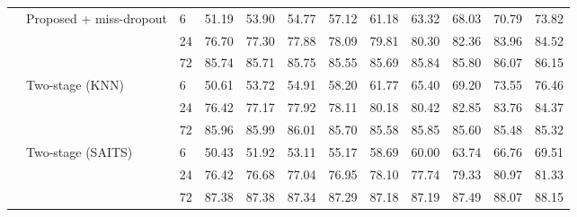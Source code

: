 \begin{table}
\begin{tabular}{lllrrrrrrrrr}
\cline{2-12}
 & \multirow[t]{3}{*}{Proposed + miss-dropout} & 6 & 51.19 & 53.90 & 54.77 & 57.12 & 61.18 & 63.32 & 68.03 & 70.79 & 73.82 \\
 &  & 24 & 76.70 & 77.30 & 77.88 & 78.09 & 79.81 & 80.30 & 82.36 & 83.96 & 84.52 \\
 &  & 72 & 85.74 & 85.71 & 85.75 & 85.55 & 85.69 & 85.84 & 85.80 & 86.07 & 86.15 \\
\cline{2-12}
 & \multirow[t]{3}{*}{Two-stage (KNN)} & 6 & 50.61 & 53.72 & 54.91 & 58.20 & 61.77 & 65.40 & 69.20 & 73.55 & 76.46 \\
 &  & 24 & 76.42 & 77.17 & 77.92 & 78.11 & 80.18 & 80.42 & 82.85 & 83.76 & 84.37 \\
 &  & 72 & 85.96 & 85.99 & 86.01 & 85.70 & 85.58 & 85.85 & 85.60 & 85.48 & 85.32 \\
\cline{2-12}
 & \multirow[t]{3}{*}{Two-stage (SAITS)} & 6 & 50.43 & 51.92 & 53.11 & 55.17 & 58.69 & 60.00 & 63.74 & 66.76 & 69.51 \\
 &  & 24 & 76.42 & 76.68 & 77.04 & 76.95 & 78.10 & 77.74 & 79.33 & 80.97 & 81.33 \\
 &  & 72 & 87.38 & 87.38 & 87.34 & 87.29 & 87.18 & 87.19 & 87.49 & 88.07 & 88.15 \\
\cline{1-12} \cline{2-12}
\bottomrule
\end{tabular}
\end{table}

